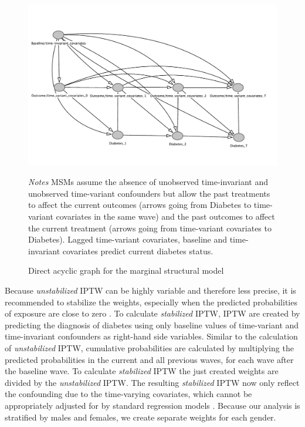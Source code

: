 \begin{figure}[!p]
\begin{center}
\caption{\label{fig:DAG_msm} Direct acyclic graph for the marginal structural model}
\includegraphics[width=\linewidth]{Chapter5/DAG/dag_msm_alt}
\end{center}
\footnotesize{\textit{Notes} \acp{MSM} assume the absence of unobserved time-invariant and unobserved time-variant confounders but allow the past treatments to affect the current outcomes  (arrows going from Diabetes to time-variant covariates in the same wave) and the past outcomes to affect the current treatment (arrows going from time-variant covariates to Diabetes).  Lagged time-variant covariates, baseline and time-invariant covariates predict current diabetes status.}
\end{figure}


Because \textit{unstabilized} \ac{IPTW} can be highly variable and therefore less precise, it is recommended to stabilize the weights, especially when the predicted probabilities of exposure are close to zero \parencite{Cole2008}. To calculate \textit{stabilized} \ac{IPTW}, \ac{IPTW} are created by predicting the diagnosis of diabetes using only baseline values of time-variant and time-invariant confounders as right-hand side variables. Similar to the calculation of \textit{unstabilized} \ac{IPTW}, cumulative probabilities are calculated by multiplying the predicted probabilities in the current and all previous waves, for each wave after the baseline wave. To calculate \textit{stabilized} \ac{IPTW} the just created weights are divided by the \textit{unstabilized} \ac{IPTW}. The resulting \textit{stabilized} \ac{IPTW} now only reflect the confounding due to the time-varying covariates, which cannot be appropriately adjusted for by standard regression models \parencite{Cole2008}. Because our analysis is stratified by males and females, we create separate weights for each gender.

